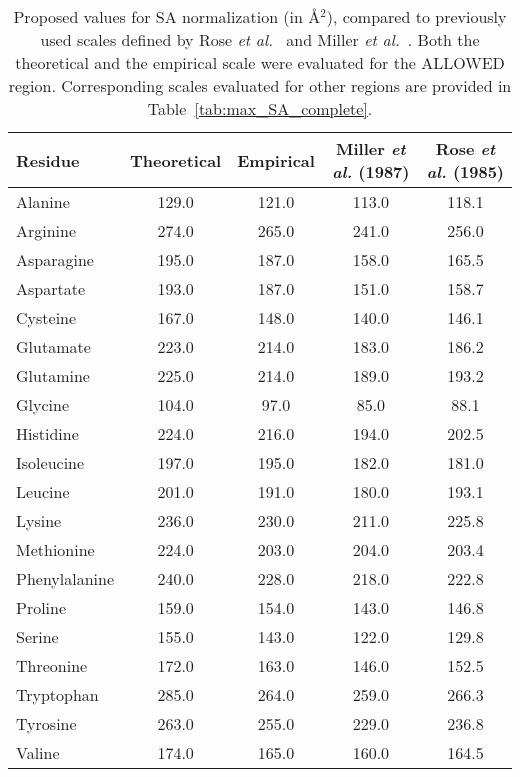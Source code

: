 \documentclass[11pt]{article}
\begin{document}
\begin{table}[H]
\caption{\label{tab:results}Proposed values for SA normalization (in \AA$^2$), compared to previously used scales defined by Rose \emph{et al.}~\cite{Rose1985} and Miller \emph{et al.}~\cite{Miller1987}. Both the theoretical and the empirical scale were evaluated for the ALLOWED region. Corresponding scales evaluated for other regions are provided in Table~\ref{tab:max_SA_complete}.}

\begin{center}
\begin{tabular}{lcccc}
Residue & Theoretical & Empirical & Miller \emph{et al.} (1987) & Rose \emph{et al.} (1985) \\
\hline Alanine & 129.0 & 121.0 & 113.0 & 118.1 \\
Arginine        & 274.0 & 265.0 & 241.0 & 256.0 \\
Asparagine    & 195.0 & 187.0 & 158.0 & 165.5 \\
Aspartate      & 193.0 & 187.0 & 151.0 & 158.7 \\
Cysteine        & 167.0 & 148.0 & 140.0 & 146.1 \\
Glutamate     & 223.0 & 214.0 & 183.0 & 186.2 \\
Glutamine      & 225.0 & 214.0 & 189.0 & 193.2  \\
Glycine          & 104.0 & 97.0 & 85.0 & 88.1  \\
Histidine        & 224.0 & 216.0 & 194.0 & 202.5  \\
Isoleucine     & 197.0 & 195.0 & 182.0 & 181.0  \\
Leucine         & 201.0 & 191.0 & 180.0 & 193.1  \\
Lysine           & 236.0 & 230.0 & 211.0 & 225.8  \\
Methionine   & 224.0 & 203.0 & 204.0 & 203.4  \\
Phenylalanine  & 240.0 & 228.0 & 218.0 & 222.8  \\
Proline & 159.0 & 154.0& 143.0 & 146.8  \\
Serine          & 155.0 & 143.0 & 122.0 & 129.8  \\
Threonine          & 172.0 & 163.0 & 146.0 & 152.5  \\
Tryptophan          & 285.0 & 264.0 & 259.0 & 266.3  \\
Tyrosine          & 263.0 & 255.0 & 229.0 & 236.8 \\
Valine          & 174.0 & 165.0 & 160.0 & 164.5  \\
\hline
\end{tabular}
\end{center}
\end{table}
\end{document}

